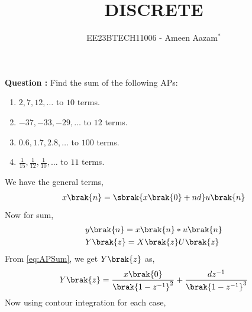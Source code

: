 \documentclass[journal,12pt,twocolumn]{IEEEtran}
\theoremstyle{remark}
\begin{document}

\vspace{3cm}

\title{DISCRETE}
\author{EE23BTECH11006 - Ameen Aazam$^{*}$%
}
\maketitle
\newpage
\bigskip

\renewcommand{\thefigure}{\theenumi}
\renewcommand{\thetable}{\theenumi}

\vspace{3cm}
\textbf{Question :}
Find the sum of the following APs:
\begin{enumerate}[label=(\alph*)]
\item $2, 7, 12, \ldots$ to $10$ terms.
\item $-37, -33, -29, \ldots$ to $12$ terms.
\item $0.6, 1.7, 2.8, \ldots$ to $100$ terms.
\item $\frac{1}{15}, \frac{1}{12}, \frac{1}{10}, \ldots$ to $11$ terms.
\end{enumerate}
\solution
\fi

We have the general terms,
\begin{align}
    x\brak{n}=\sbrak{x\brak{0}+nd}u\brak{n}
\end{align}
Now for sum,
\begin{align}
    &y\brak{n}=x\brak{n}\ast u\brak{n} \\
    &Y\brak{z}=X\brak{z}U\brak{z}
\end{align}
From \eqref{eq:APSum}, we get $Y\brak{z}$ as,
\begin{align}
    Y\brak{z}=\frac{x\brak{0}}{\brak{1-z^{-1}}^2}+\frac{dz^{-1}}{\brak{1-z^{-1}}^3}
\end{align}
Now using contour integration for each case,
\end{document}

